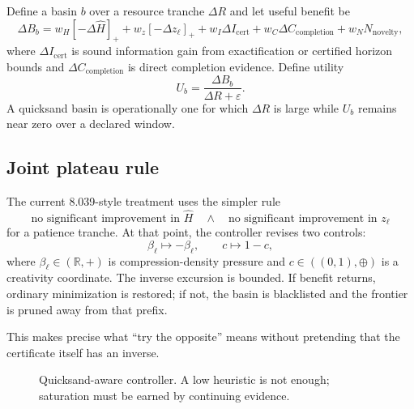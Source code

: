 \documentclass[11pt]{article}
\newcommand{\eps}{\varepsilon}
\newcommand{\Hhat}{\widehat H}
\begin{document}
Define a basin $b$ over a resource tranche $\Delta R$ and let useful benefit be
\[
\Delta B_b
= w_H[-\Delta\Hhat]_+
+ w_z[-\Delta z_\ell]_+
+ w_I\Delta I_{\mathrm{cert}}
+ w_C\Delta C_{\mathrm{completion}}
+ w_N N_{\mathrm{novelty}},
\]
where $\Delta I_{\mathrm{cert}}$ is sound information gain from exactification or certified horizon bounds and $\Delta C_{\mathrm{completion}}$ is direct completion evidence. Define utility
\[
U_b=\frac{\Delta B_b}{\Delta R+\eps}.
\]
A quicksand basin is operationally one for which $\Delta R$ is large while $U_b$ remains near zero over a declared window.

\subsection{Joint plateau rule}

The current 8.039-style treatment uses the simpler rule
\[
\text{no significant improvement in }\Hhat
\quad\land\quad
\text{no significant improvement in }z_\ell
\]
for a patience tranche. At that point, the controller revises two controls:
\[
\beta_\ell\mapsto-\beta_\ell,
\qquad
c\mapsto1-c,
\]
where $\beta_\ell\in(\mathbb R,+)$ is compression-density pressure and $c\in((0,1),\oplus)$ is a creativity coordinate. The inverse excursion is bounded. If benefit returns, ordinary minimization is restored; if not, the basin is blacklisted and the frontier is pruned away from that prefix.

This makes precise what ``try the opposite'' means without pretending that the certificate itself has an inverse.

\begin{figure}[ht]
\centering
{}
\caption{Quicksand-aware controller. A low heuristic is not enough; saturation must be earned by continuing evidence.}
\end{figure}
\end{document}
